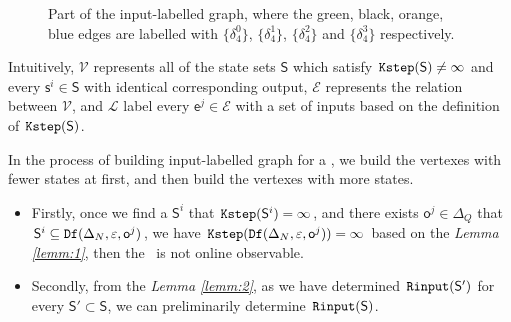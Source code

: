 \begin{figure}[thpb]
      \centering
      \caption{Part of the input-labelled graph, where the green, black, orange, blue edges are labelled with $\{\delta_4^0\}$, $\{\delta_4^1\}$, $\{\delta_4^2\}$ and $\{\delta_4^3\}$ respectively.}
      \label{fig:4}
\end{figure}

Intuitively, $\mathcal{V}$ represents all of the state sets $\mathsf{S}$ which satisfy ${\tt Kstep}(\mathsf{S})\ne \infty$ and every $\mathsf{s}^i\in\mathsf{S}$ with identical corresponding output, $\mathcal{E}$ represents the relation between $\mathcal{V}$, and $\mathcal{L}$ label every $\mathsf{e}^j \in\mathcal{E}$ with a set of inputs based on the definition of ${\tt Kstep}(\mathsf{S})$. %


In the process of building input-labelled graph for a \BCN, we build the vertexes with fewer states at first, and then build the vertexes with more states.
\begin{itemize}
\item  Firstly, once we find a $\mathsf{S}^i$ that ${\tt Kstep}(\mathsf{S}^i)= \infty$, and there exists $\mathsf{o}^{j}\in \Delta_Q$ that $\mathsf{S}^{i}\subseteq {\tt Df}(\Delta_N,\varepsilon, \mathsf{o}^{j})$, we have ${\tt Kstep}({\tt Df}(\Delta_N,\varepsilon, \mathsf{o}^{j}))= \infty$ based on the {\em Lemma \ref{lemm:1}}, then the \BCN\ is not online observable.
\item  Secondly, from the {\em Lemma \ref{lemm:2}}, as we have determined ${\tt Rinput}(\mathsf{S}')$ for every $\mathsf{S}'\subset\mathsf{S}$, we can preliminarily determine ${\tt Rinput}(\mathsf{S})$.
 \end{itemize}
